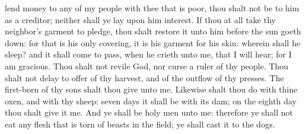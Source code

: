 lend money to any of my people with thee that is poor, thou shalt not be to him as a creditor; neither shall ye lay upon him interest. If thou at all take thy neighbor’s garment to pledge, thou shalt restore it unto him before the sun goeth down: for that is his only covering, it is his garment for his skin: wherein shall he sleep? and it shall come to pass, when he crieth unto me, that I will hear; for I am gracious.  Thou shalt not revile God, nor curse a ruler of thy people. Thou shalt not delay to offer of thy harvest, and of the outflow of thy presses. The first-born of thy sons shalt thou give unto me. Likewise shalt thou do with thine oxen, and with thy sheep: seven days it shall be with its dam; on the eighth day thou shalt give it me. And ye shall be holy men unto me: therefore ye shall not eat any flesh that is torn of beasts in the field; ye shall cast it to the dogs. 

